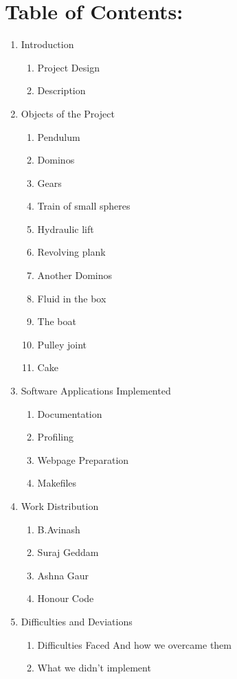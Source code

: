 \documentclass{article}
\begin{document}
\section*{\huge Table of Contents:} \label{Contents}
\begin{enumerate}
    \LARGE  \item Introduction
    \begin{enumerate} [label*=\arabic*.]
        \large \item Project Design
        \large \item Description
    \end{enumerate}
    \LARGE  \item Objects of the Project
    \begin{enumerate} [label*=\arabic*.]
        \large \item Pendulum
        \large \item Dominos
        \large \item Gears
        \large \item Train of small spheres
        \large \item Hydraulic lift
        \large \item Revolving plank
        \large \item Another Dominos
        \large \item Fluid in the box
        \large \item The boat 
        \large \item Pulley joint
        \large \item Cake 
    \end{enumerate}
    \LARGE  \item Software Applications Implemented
    \begin{enumerate} [label*=\arabic*.]
        \large \item Documentation
        \large \item Profiling
        \large \item Webpage Preparation
        \large \item Makefiles
    \end{enumerate}
    \LARGE  \item Work Distribution
    \begin{enumerate} [label*=\arabic*.]
        \large \item B.Avinash
        \large \item Suraj Geddam
        \large \item Ashna Gaur
        \large \item Honour Code
    \end{enumerate}
    \LARGE  \item Difficulties and Deviations
    \begin{enumerate} [label*=\arabic*.]
        \large \item Difficulties Faced And how we overcame them
        \large \item What we didn't implement
    \end{enumerate}
\end{enumerate}
 
\end{document}
